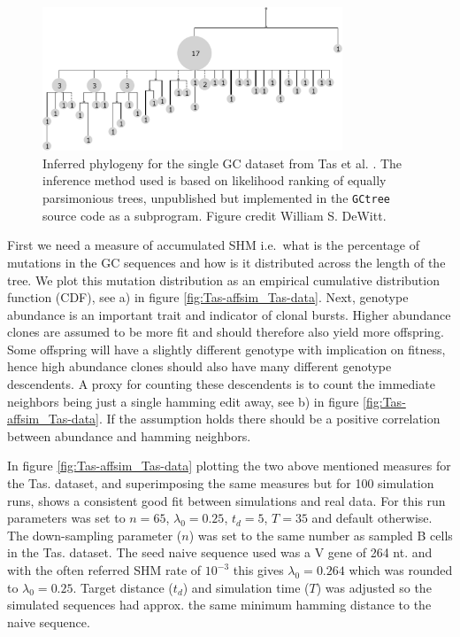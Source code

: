 \begin{figure}[!ht]
    \centering
    \includegraphics[width=0.8\textwidth]{figures/Tas_tree.pdf}
    \caption{
        \label{fig:Tas_tree}
        Inferred phylogeny for the single GC dataset from Tas et al. \cite{tas2016visualizing}.
        The inference method used is based on likelihood ranking of equally parsimonious trees, unpublished but implemented in the \texttt{GCtree} source code as a subprogram.
        Figure credit William S. DeWitt.
    }
\end{figure}


First we need a measure of accumulated SHM i.e.\ what is the percentage of mutations in the GC sequences and how is it distributed across the length of the tree.
We plot this mutation distribution as an empirical cumulative distribution function (CDF), see a) in figure \ref{fig:Tas-affsim_Tas-data}.
Next, genotype abundance is an important trait and indicator of clonal bursts.
Higher abundance clones are assumed to be more fit and should therefore also yield more offspring.
Some offspring will have a slightly different genotype with implication on fitness, hence high abundance clones should also have many different genotype descendents.
A proxy for counting these descendents is to count the immediate neighbors being just a single hamming edit away, see b) in figure \ref{fig:Tas-affsim_Tas-data}.
If the assumption holds there should be a positive correlation between abundance and hamming neighbors.

In figure \ref{fig:Tas-affsim_Tas-data} plotting the two above mentioned measures for the Tas. dataset, and superimposing the same measures but for 100 simulation runs, shows a consistent good fit between simulations and real data.
For this run parameters was set to $n=65$, $\lambda_0=0.25$, $t_d=5$, $T=35$ and default otherwise.
The down-sampling parameter ($n$) was set to the same number as sampled B cells in the Tas. dataset.
The seed naive sequence used was a V gene of 264 nt. and with the often referred SHM rate of $10^{-3}$ \cite{victora2012germinal} this gives $\lambda_0=0.264$ which was rounded to $\lambda_0=0.25$.
Target distance ($t_d$) and simulation time ($T$) was adjusted so the simulated sequences had approx. the same minimum hamming distance to the naive sequence.

